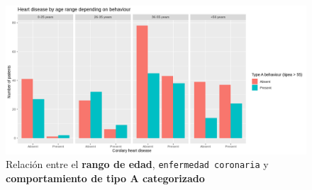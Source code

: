 \documentclass[a4paper, 9pt]{article}
\begin{document}
\vspace{3mm}

\begin{figure}[H]
    \centering
    \includegraphics[scale=0.31]{images/question-4/plot1.png}
    \caption{Relación entre el \textbf{rango de edad}, \texttt{enfermedad coronaria} y \textbf{comportamiento de tipo A categorizado}}
    \label{fig:question4-uplot1}
\end{figure}

\vspace{3mm}
\end{document}
